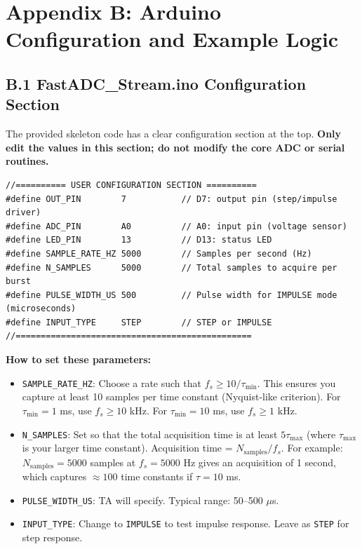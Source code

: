 \documentclass[11pt,letterpaper]{article}
\begin{document}
\section*{Appendix B: Arduino Configuration and Example Logic}

\subsection*{B.1 FastADC\_Stream.ino Configuration Section}

The provided skeleton code has a clear configuration section at the top. \textbf{Only edit the values in this section; do not modify the core ADC or serial routines.}

\begin{verbatim}
//========== USER CONFIGURATION SECTION ==========
#define OUT_PIN        7           // D7: output pin (step/impulse driver)
#define ADC_PIN        A0          // A0: input pin (voltage sensor)
#define LED_PIN        13          // D13: status LED
#define SAMPLE_RATE_HZ 5000        // Samples per second (Hz)
#define N_SAMPLES      5000        // Total samples to acquire per burst
#define PULSE_WIDTH_US 500         // Pulse width for IMPULSE mode (microseconds)
#define INPUT_TYPE     STEP        // STEP or IMPULSE
//===============================================
\end{verbatim}

\noindent
\textbf{How to set these parameters:}

\begin{itemize}
    \item \texttt{SAMPLE\_RATE\_HZ}: Choose a rate such that $f_s \ge 10 / \tau_{\min}$. This ensures you capture at least 10 samples per time constant (Nyquist-like criterion). For $\tau_{\min} = 1$ ms, use $f_s \ge 10$ kHz. For $\tau_{\min} = 10$ ms, use $f_s \ge 1$ kHz.

    \item \texttt{N\_SAMPLES}: Set so that the total acquisition time is at least $5\tau_{\max}$ (where $\tau_{\max}$ is your larger time constant). Acquisition time = $N_{\text{samples}} / f_s$. For example: $N_{\text{samples}} = 5000$ samples at $f_s = 5000$ Hz gives an acquisition of 1 second, which captures $\approx 100$ time constants if $\tau = 10$ ms.

    \item \texttt{PULSE\_WIDTH\_US}: TA will specify. Typical range: 50--500 $\mu$s.

    \item \texttt{INPUT\_TYPE}: Change to \texttt{IMPULSE} to test impulse response. Leave as \texttt{STEP} for step response.
\end{itemize}
\end{document}
